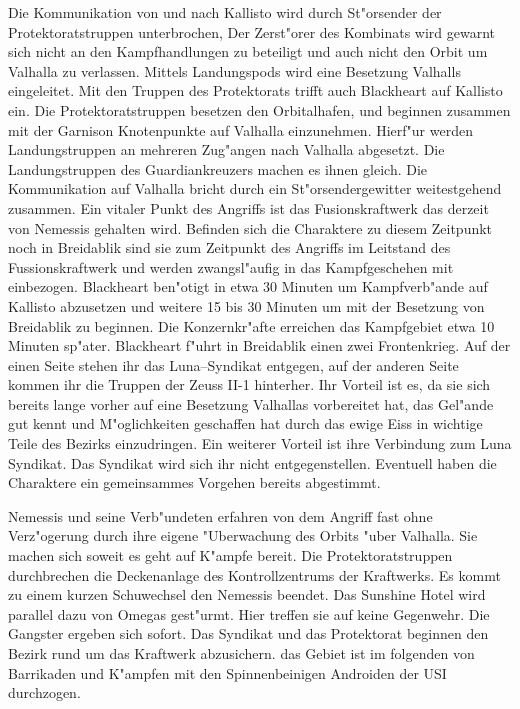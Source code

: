 Die Kommunikation von und nach Kallisto wird durch St"orsender der Protektoratstruppen unterbrochen, Der Zerst"orer des Kombinats wird gewarnt sich nicht an den Kampfhandlungen zu beteiligt und auch nicht den Orbit um Valhalla zu verlassen. Mittels Landungspods wird eine Besetzung Valhalls eingeleitet. Mit den Truppen des Protektorats trifft auch Blackheart auf Kallisto ein. Die Protektoratstruppen besetzen den Orbitalhafen, und beginnen zusammen mit der Garnison  Knotenpunkte auf Valhalla einzunehmen. Hierf"ur werden Landungstruppen an mehreren Zug"angen nach Valhalla abgesetzt. Die Landungstruppen des Guardiankreuzers machen es ihnen gleich. Die Kommunikation auf Valhalla bricht durch ein St"orsendergewitter weitestgehend zusammen. Ein vitaler Punkt des Angriffs ist das Fusionskraftwerk das derzeit von Nemessis gehalten wird. Befinden sich die Charaktere zu diesem Zeitpunkt noch in Breidablik sind sie zum Zeitpunkt des Angriffs im Leitstand des Fussionskraftwerk  und werden zwangsl"aufig in das Kampfgeschehen mit einbezogen. Blackheart ben"otigt in etwa 30 Minuten um Kampfverb"ande auf Kallisto abzusetzen und weitere 15 bis 30 Minuten um mit der Besetzung von Breidablik zu beginnen. Die Konzernkr"afte erreichen das Kampfgebiet etwa 10 Minuten sp"ater. Blackheart f"uhrt in Breidablik einen zwei Frontenkrieg. Auf der einen Seite stehen ihr das Luna--Syndikat entgegen, auf der anderen Seite kommen ihr die Truppen der Zeuss II-1 hinterher. Ihr Vorteil ist es, da\3 sie sich bereits lange vorher auf eine Besetzung Valhallas vorbereitet hat, das Gel"ande gut kennt und M"oglichkeiten geschaffen hat durch das ewige Eiss in wichtige Teile des Bezirks einzudringen. Ein weiterer Vorteil ist ihre Verbindung zum Luna Syndikat. Das Syndikat wird sich ihr nicht entgegenstellen. Eventuell haben die Charaktere ein gemeinsammes Vorgehen bereits abgestimmt.

Nemessis und seine Verb"undeten erfahren von dem Angriff fast ohne Verz"ogerung durch ihre eigene "Uberwachung des Orbits "uber Valhalla. Sie machen sich soweit es geht auf K"ampfe bereit. Die Protektoratstruppen durchbrechen die Deckenanlage des Kontrollzentrums der Kraftwerks. Es kommt zu einem kurzen Schu\3wechsel den Nemessis beendet. Das Sunshine Hotel wird parallel dazu von Omegas gest"urmt. Hier treffen sie auf keine Gegenwehr. Die Gangster ergeben sich sofort. Das Syndikat und das Protektorat beginnen den Bezirk rund um das Kraftwerk abzusichern. das Gebiet ist im folgenden von Barrikaden und K"ampfen mit den Spinnenbeinigen Androiden der USI durchzogen.

